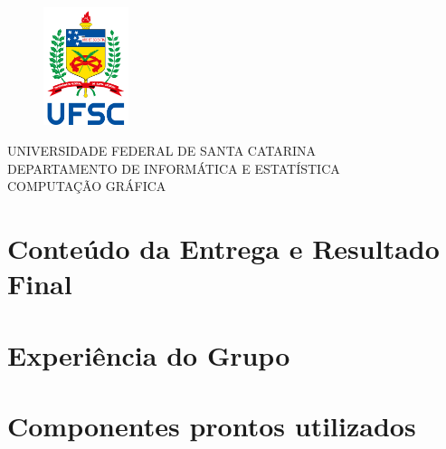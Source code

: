 \documentclass[
	12pt,				%
	openright,			%
	oneside,			%
	a4paper,			%
	english,			%
	brazil,				%
	]{abntex2}
\renewcommand{\imprimircapa}{%
    \begin{capa}%
        \begin{figure}
            \center
            \includegraphics[width=2.5cm]{imagens/logo_ufsc.png}
        \end{figure}
        \center
        \ABNTEXchapterfont\large{UNIVERSIDADE FEDERAL DE SANTA CATARINA\\ DEPARTAMENTO DE INFORMÁTICA E ESTATÍSTICA \\ COMPUTAÇÃO GRÁFICA}
        \vfill
        \begin{center}
        \ABNTEXchapterfont\bfseries\LARGE\imprimirtitulo
        \end{center}
        \vfill
        {\ABNTEXchapterfont\large\imprimirautor}
        \vfill
        \large\imprimirlocal
        \large\imprimirdata
        \vspace*{1cm}
        \end{capa}
}
\begin{document}
\imprimircapa

\ABNTEXsectionfont
\tableofcontents
\chapter{Conteúdo da Entrega e Resultado Final}
    
\chapter{Experiência do Grupo}
\textual
    
\chapter{Componentes prontos utilizados}
\textual
    
\end{document}
